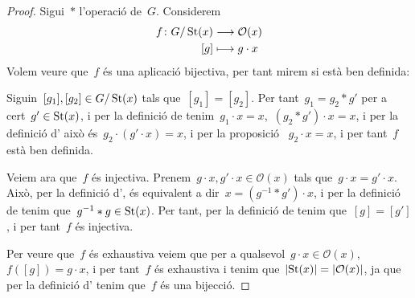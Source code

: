 \documentclass[../estructures-algebraiques.tex]{subfiles}
\begin{document}
    \begin{proof}
        Sigui~\(\ast\) l'operació de~\(G\).
        Considerem
        \begin{align*}
        f\colon G/\operatorname{St}(x)&\longrightarrow\mathcal{O}(x)\\
        [g]&\longmapsto g\cdot x
        \end{align*}
        Volem veure que~\(f\) és una aplicació bijectiva, per tant mirem si està ben definida:

        Siguin~\([g_{1}],[g_{2}]\in G/\operatorname{St}(x)\) tals que~\([g_{1}]=[g_{2}]\).
        Per tant~\(g_{1}=g_{2}\ast g'\) per a cert~\(g'\in\operatorname{St}(x)\), i per la definició de  tenim~\(g_{1}\cdot x=x\),~\((g_{2}\ast g')\cdot x=x\), i per la definició d' això és~\(g_{2}\cdot(g'\cdot x)=x\), i per la proposició ~\(g_{2}\cdot x=x\), i per tant~\(f\) està ben definida.

        Veiem ara que~\(f\) és injectiva.
        Prenem~\(g\cdot x,g'\cdot x\in\mathcal{O}(x)\) tals que~\(g\cdot x=g'\cdot x\).
        Això, per la definició d', és equivalent a dir~\(x=(g^{-1}\ast g')\cdot x\), i per la definició de  tenim que~\(g^{-1}\ast g\in\operatorname{St}(x)\).
        Per tant, per la definició de  tenim que~\([g]=[g']\), i per tant~\(f\) és injectiva.

        Per veure que~\(f\) és exhaustiva veiem que per a qualsevol~\(g\cdot x\in\mathcal{O}(x)\),~\(f([g])=g\cdot x\), i per tant~\(f\) és exhaustiva i tenim que~\(\abs{\St(x)}=\abs{\mathcal{O}(x)}\), ja que per la definició d' tenim que~\(f\) és una bijecció.
    \end{proof}
\end{document}
